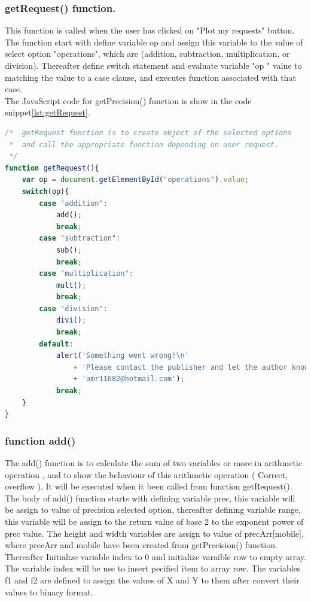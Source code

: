 \documentclass[11pt]{article}
\begin{document}
\subsubsection{getRequest() function.} 
This function is called when the user has clicked on "Plot my requests" button. The function start with define variable op and assign this variable to the value of select option "operations", which are (addition, subtraction, multiplication, or division). Thereafter define switch statement and evaluate variable "op " value to matching the value to a case clause, and executes function associated with that case.\\
The JavaScript code for getPrecision() function is show in the code snippet\ref{lst:getRequest}.\\
\begin{lstlisting}[label={lst:getRequest}, language=Javascript, caption={getPrecision function},]
/*	getRequest function is to create object of the selected options
 *	and call the appropriate function depending on user request.
 */
function getRequest(){
	var op = document.getElementById("operations").value;
	switch(op){
		case "addition":
			add();
			break;
		case "subtraction":
			sub();
			break;
		case "multiplication":
			mult();
			break;
		case "division":
			divi();
			break;
		default:
			alert('Something went wrong!\n'
				+ 'Please contact the publisher and let the author know about the bug.\n'
				+ 'amr11682@hotmail.com');
			break;
	}
}
\end{lstlisting}

\subsubsection{function add()}
The add() function is to calculate the sum of two variables or more in arithmetic operation , and to show the behaviour of this arithmetic operation ( Correct, overflow ).  It will be executed when it been called from function getRequest().\\
The body of add() function starts with defining variable prec, this variable will be assign to value of precision selected option, thereafter defining variable  range, this variable will be assign to the return value of base 2 to the exponent power of prec value.
The height and width variables are assign to value of precArr[mobile], where precArr and mobile have been created from getPrecision() function.
Thereafter Initialize variable index to 0 and initialize varaible row to empty array. The variable index will be use to insert pecified item to array row. The variables f1 and f2 are defined to assign the values of X and Y to them after convert their values to binary format.\\
\end{document}
